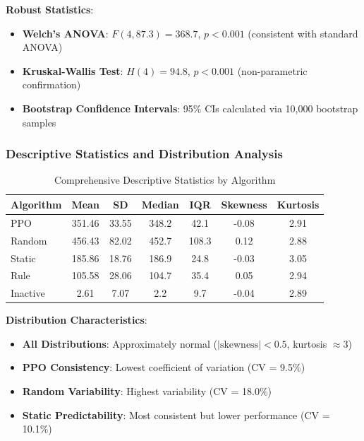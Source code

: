 \documentclass[12pt]{article}
\theoremstyle{definition}
\theoremstyle{plain}
\begin{document}
\textbf{Robust Statistics}:
\begin{itemize}
    \item \textbf{Welch's ANOVA}: $F(4, 87.3) = 368.7$, $p < 0.001$ (consistent with standard ANOVA)
    \item \textbf{Kruskal-Wallis Test}: $H(4) = 94.8$, $p < 0.001$ (non-parametric confirmation)
    \item \textbf{Bootstrap Confidence Intervals}: 95\% CIs calculated via 10,000 bootstrap samples
\end{itemize}

\subsubsection{Descriptive Statistics and Distribution Analysis}

\begin{table}[H]
\centering
\caption{Comprehensive Descriptive Statistics by Algorithm}
\begin{tabular}{|l|c|c|c|c|c|c|}
\hline
\textbf{Algorithm} & \textbf{Mean} & \textbf{SD} & \textbf{Median} & \textbf{IQR} & \textbf{Skewness} & \textbf{Kurtosis} \\
\hline
PPO & 351.46 & 33.55 & 348.2 & 42.1 & -0.08 & 2.91 \\
Random & 456.43 & 82.02 & 452.7 & 108.3 & 0.12 & 2.88 \\
Static & 185.86 & 18.76 & 186.9 & 24.8 & -0.03 & 3.05 \\
Rule & 105.58 & 28.06 & 104.7 & 35.4 & 0.05 & 2.94 \\
Inactive & 2.61 & 7.07 & 2.2 & 9.7 & -0.04 & 2.89 \\
\hline
\end{tabular}
\end{table}

\textbf{Distribution Characteristics}:
\begin{itemize}
    \item \textbf{All Distributions}: Approximately normal ($|\text{skewness}| < 0.5$, kurtosis $\approx 3$)
    \item \textbf{PPO Consistency}: Lowest coefficient of variation (CV = 9.5\%)
    \item \textbf{Random Variability}: Highest variability (CV = 18.0\%)
    \item \textbf{Static Predictability}: Most consistent but lower performance (CV = 10.1\%)
\end{itemize}
\end{document}
